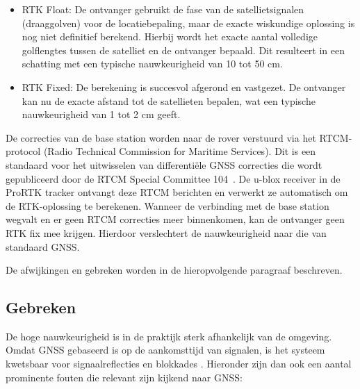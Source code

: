 \begin{itemize}
	\item RTK Float: De ontvanger gebruikt de fase van de satellietsignalen (draaggolven) voor de locatiebepaling, 
	maar de exacte wiskundige oplossing is nog niet definitief berekend. Hierbij wordt het exacte aantal volledige golflengtes tussen de satelliet en de ontvanger bepaald. Dit resulteert in een schatting met een typische nauwkeurigheid van 10 tot 50 cm.
	\item RTK Fixed: De berekening is succesvol afgerond en vastgezet. De ontvanger kan nu de exacte afstand tot de satellieten bepalen, wat een typische nauwkeurigheid van 1 tot 2 cm geeft.
\end{itemize}

De correcties van de base station worden naar de rover verstuurd via 
het RTCM-protocol (Radio Technical Commission for Maritime Services). 
Dit is een standaard voor het uitwisselen van 
differentiële GNSS correcties die wordt gepubliceerd door de RTCM 
Special Committee 104~\cite{rtcm_standard}. De u-blox receiver in de 
ProRTK tracker ontvangt deze RTCM berichten en verwerkt ze automatisch 
om de RTK-oplossing te berekenen. Wanneer de verbinding met de base station wegvalt en er geen RTCM correcties meer binnenkomen, kan de ontvanger geen RTK fix mee krijgen. Hierdoor verslechtert de nauwkeurigheid naar die van standaard GNSS.

De afwijkingen en gebreken worden in de hieropvolgende paragraaf beschreven.

\subsection{Gebreken}
De hoge nauwkeurigheid is in de praktijk sterk afhankelijk van de omgeving. Omdat GNSS gebaseerd is op de aankomsttijd van signalen, is het systeem kwetsbaar voor signaalreflecties en blokkades \cite{NovAtelMultipath2026}. Hieronder zijn dan ook een aantal prominente fouten die relevant zijn kijkend naar GNSS:

